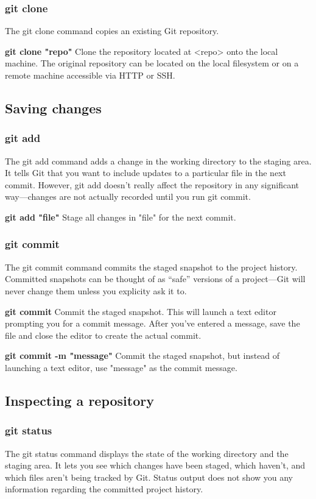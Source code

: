 \documentclass{article}
\begin{document}
    \subsubsection{git clone}
        The git clone command copies an existing Git repository. 
        
        \textbf{git clone "repo"}
        Clone the repository located at <repo> onto the local machine. The original repository can be located on the local filesystem or on a remote machine accessible via HTTP or SSH.
    
    \subsection{Saving changes}
    \subsubsection{git add}
        The git add command adds a change in the working directory to the staging area. It tells Git that you want to include updates to a particular file in the next commit. However, git add doesn't really affect the repository in any significant way—changes are not actually recorded until you run git commit.

        \textbf{git add "file"}
        Stage all changes in "file" for the next commit.
    
    \subsubsection{git commit}
        The git commit command commits the staged snapshot to the project history. Committed snapshots can be thought of as “safe” versions of a project—Git will never change them unless you explicity ask it to. 

        \textbf{git commit}
        Commit the staged snapshot. This will launch a text editor prompting you for a commit message. After you’ve entered a message, save the file and close the editor to create the actual commit. 

        \textbf{git commit -m "message"}
        Commit the staged snapshot, but instead of launching a text editor, use "message" as the commit message.    
    \subsection{Inspecting a repository}
    \subsubsection{git status}
        The git status command displays the state of the working directory and the staging area. It lets you see which changes have been staged, which haven’t, and which files aren’t being tracked by Git. Status output does not show you any information regarding the committed project history.
\end{document}
